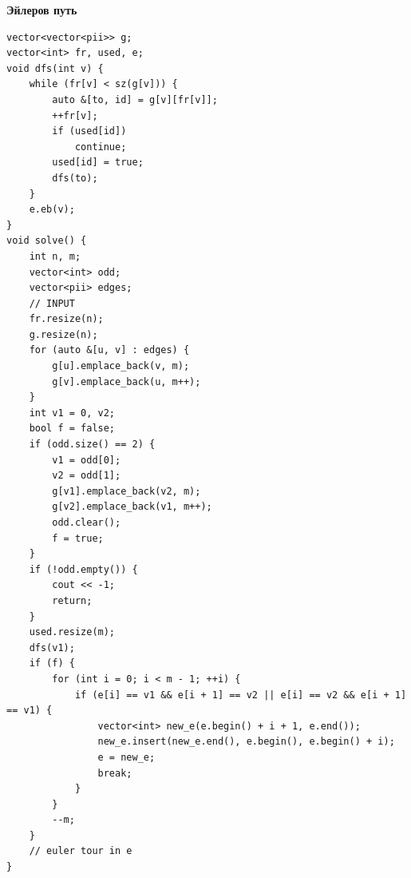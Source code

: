 \documentclass[a4paper, 10pt]{article}
\begin{document}
{\Large \textbf{Эйлеров путь}}
\begin{lstlisting}
vector<vector<pii>> g;
vector<int> fr, used, e;
void dfs(int v) {
	while (fr[v] < sz(g[v])) {
		auto &[to, id] = g[v][fr[v]];
		++fr[v];
		if (used[id])
			continue;
		used[id] = true;
		dfs(to);
	}
	e.eb(v);
}
void solve() {
	int n, m;
    vector<int> odd;
	vector<pii> edges;
    // INPUT
    fr.resize(n);
	g.resize(n);
	for (auto &[u, v] : edges) {
		g[u].emplace_back(v, m);
		g[v].emplace_back(u, m++);
	}
	int v1 = 0, v2;
	bool f = false;
	if (odd.size() == 2) {
		v1 = odd[0];
		v2 = odd[1];
		g[v1].emplace_back(v2, m);
		g[v2].emplace_back(v1, m++);
		odd.clear();
		f = true;
	}
	if (!odd.empty()) {
		cout << -1;
		return;
	}
	used.resize(m);
	dfs(v1);
	if (f) {
		for (int i = 0; i < m - 1; ++i) {
			if (e[i] == v1 && e[i + 1] == v2 || e[i] == v2 && e[i + 1] == v1) {
				vector<int> new_e(e.begin() + i + 1, e.end());
				new_e.insert(new_e.end(), e.begin(), e.begin() + i);
				e = new_e;
				break;
			}
		}
		--m;
	}
	// euler tour in e
}
\end{lstlisting}
\end{document}
